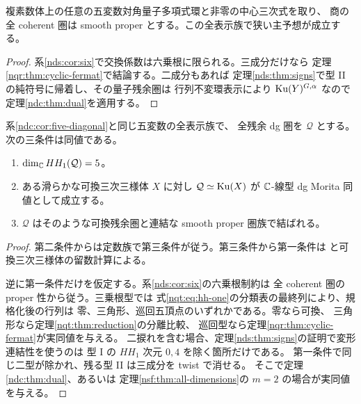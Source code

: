 \begin{corollary}[五変数の全対角交換型]\label{ndc:cor:five-diagonal}
複素数体上の任意の五変数対角量子多項式環と非零の中心三次式を取り、
商の全 coherent 圏は smooth proper とする。この全表示族で狭い主予想が成立する。
\end{corollary}
\begin{proof}
系\ref{nds:cor:six}で交換係数は六乗根に限られる。三成分だけなら
定理\ref{nqr:thm:cyclic-fermat}で結論する。二成分もあれば
定理\ref{nds:thm:signs}で型 II の純符号に帰着し、その量子残余圏は
行列不変環表示により $\operatorname{Ku}(Y)^{G,\alpha}$ なので定理\ref{ndc:thm:dual}を適用する。
\end{proof}

\begin{corollary}[対角三様体における $HH_1$ 判定]\label{ndc:cor:hh-characterization}
系\ref{ndc:cor:five-diagonal}と同じ五変数の全表示族で、
全残余 dg 圏を $\mathcal Q$ とする。次の三条件は同値である。
\begin{enumerate}
\item $\dim_{\mathbb C}HH_1(\mathcal Q)=5$。
\item ある滑らかな可換三次三様体 $X$ に対し
$\mathcal Q\simeq\operatorname{Ku}(X)$ が $\mathbb C$-線型 dg Morita 同値として成立する。
\item $\mathcal Q$ はそのような可換残余圏と連結な smooth proper 圏族で結ばれる。
\end{enumerate}
\end{corollary}
\begin{proof}
第二条件からは定数族で第三条件が従う。第三条件から第一条件は
\cite[Theorem~3.5]{QFOPerryHodge}と可換三次三様体の留数計算による。

逆に第一条件だけを仮定する。系\ref{nds:cor:six}の六乗根制約は
全 coherent 圏の proper 性から従う。三乗根型では
式\eqref{nqt:eq:hh-one}の分類表の最終列により、規格化後の行列は
零、三角形、巡回五頂点のいずれかである。零なら可換、
三角形なら定理\ref{nqt:thm:reduction}の分離比較、
巡回型なら定理\ref{nqr:thm:cyclic-fermat}が実同値を与える。
二捩れを含む場合、定理\ref{nds:thm:signs}の証明で変形連結性を使うのは
型 I の $HH_1$ 次元 $0,4$ を除く箇所だけである。
第一条件で同じ二型が除かれ、残る型 II は三成分を twist で消せる。
そこで定理\ref{ndc:thm:dual}、あるいは
定理\ref{nsf:thm:all-dimensions}の $m=2$ の場合が実同値を与える。
\end{proof}

